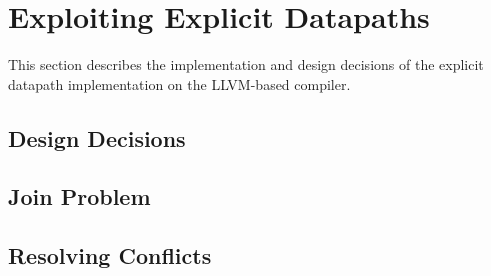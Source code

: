 



\section{Exploiting Explicit Datapaths}\label{sec:expl_bp_impl}
This section describes the implementation and design decisions of the explicit datapath implementation on the LLVM-based compiler.

\subsection{Design Decisions}\label{sec:design_decisions}



\subsection{Join Problem}\label{sec:join_prob}


\subsection{Resolving Conflicts}\label{sec:conflicts}


%
